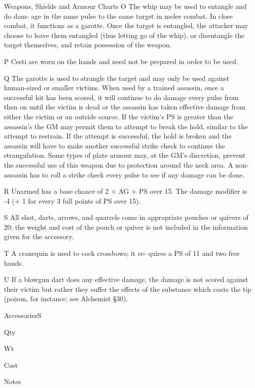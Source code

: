 \begin{Table}{Weapons, Shields and Armour Charts}
O The whip may be used to entangle and do dam-
age  in  the  same  pulse  to  the  same  target  in  melee 
combat.  In  close  combat,  it  functions  as  a  garotte. 
Once  the  target  is  entangled,  the  attacker  may 
choose  to  leave  them entangled  (thus  letting  go  of 
the whip), or disentangle the target themselves, and 
retain possession of the weapon. 

P  Cesti  are  worn  on  the  hands  and  need  not  be 
prepared in order to be used. 

Q  The  garotte  is  used  to  strangle  the  target  and 
may  only  be  used  against  human-sized  or  smaller 
victims.  When  used  by  a  trained  assassin,  once  a 
successful  hit  has  been  scored,  it  will  continue  to 
do  damage  every  pulse  from  then  on  until  the 
victim  is  dead  or  the  assassin  has  taken  effective 
damage from either the victim or an outside source. 
If the victim’s PS is greater than the assassin’s the 
GM may permit them to attempt to break the hold, 
similar  to  the  attempt  to  restrain.  If  the  attempt  is 
successful, the hold is broken and the assassin will 
have  to  make  another  successful  strike  check  to 
continue  the  strangulation.  Some  types  of  plate 
armour  may,  at  the  GM’s  discretion,  prevent  the 
successful  use  of  this  weapon  due  to  protection 
around  the  neck  area.  A  non-assassin  has  to  roll  a 
strike  check  every  pulse  to  see  if  any  damage  can 
be done. 

R Unarmed has a base chance of 2 × AG + PS over 
15. The damage modifier is -4 (+ 1 for every 3 full 
points of PS over 15). 

S  All  shot,  darts,  arrows,  and  quarrels  come  in 
appropriate  pouches  or  quivers  of  20;  the  weight 
and  cost  of  the  pouch  or  quiver  is  not  included  in 
the information given for the accessory. 

T  A  cranequin  is  used  to  cock  crossbows;  it  re-
quires a PS of 11 and two free hands. 

U If a blowgun dart does any effective damage, the 
damage is not scored against their victim but rather 
they suffer the effects of the substance which coats 
the tip (poison, for instance; see Alchemist §30). 

AccessoriesS 

Qty 

Wt 

Cost 

Notes 


\end{Table}
